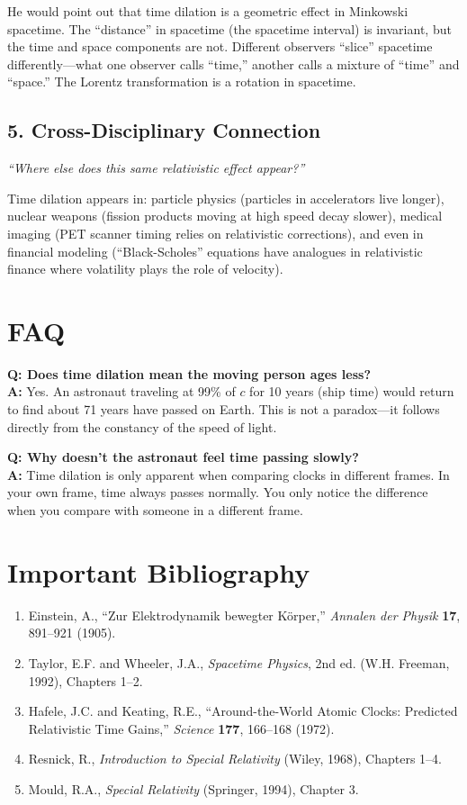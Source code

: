 He would point out that time dilation is a geometric effect in Minkowski spacetime. The ``distance'' in spacetime (the spacetime interval) is invariant, but the time and space components are not. Different observers ``slice'' spacetime differently---what one observer calls ``time,'' another calls a mixture of ``time'' and ``space.'' The Lorentz transformation is a rotation in spacetime.

\subsection*{5. Cross-Disciplinary Connection}
\textit{``Where else does this same relativistic effect appear?''}

Time dilation appears in: particle physics (particles in accelerators live longer), nuclear weapons (fission products moving at high speed decay slower), medical imaging (PET scanner timing relies on relativistic corrections), and even in financial modeling (``Black-Scholes'' equations have analogues in relativistic finance where volatility plays the role of velocity).
\section*{FAQ}

\textbf{Q: Does time dilation mean the moving person ages less?}\\
\textbf{A:} Yes. An astronaut traveling at 99\% of $c$ for 10 years (ship time) would return to find about 71 years have passed on Earth. This is not a paradox---it follows directly from the constancy of the speed of light.

\textbf{Q: Why doesn't the astronaut feel time passing slowly?}\\
\textbf{A:} Time dilation is only apparent when comparing clocks in different frames. In your own frame, time always passes normally. You only notice the difference when you compare with someone in a different frame.
\section*{Important Bibliography}

\begin{enumerate}
\item Einstein, A., ``Zur Elektrodynamik bewegter K\"orper,'' \textit{Annalen der Physik} \textbf{17}, 891--921 (1905).
\item Taylor, E.F. and Wheeler, J.A., \textit{Spacetime Physics}, 2nd ed. (W.H. Freeman, 1992), Chapters 1--2.
\item Hafele, J.C. and Keating, R.E., ``Around-the-World Atomic Clocks: Predicted Relativistic Time Gains,'' \textit{Science} \textbf{177}, 166--168 (1972).
\item Resnick, R., \textit{Introduction to Special Relativity} (Wiley, 1968), Chapters 1--4.
\item Mould, R.A., \textit{Special Relativity} (Springer, 1994), Chapter 3.
\end{enumerate}

